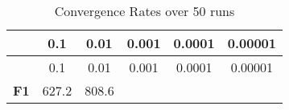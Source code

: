 \documentclass[12pt,a4paper]{article}
\begin{document}
\begin{longtable}[c]{@{}cccccc@{}}
\caption{Convergence Rates over 50 runs}\tabularnewline
\toprule
\begin{minipage}[b]{0.12\columnwidth}\centering\strut
~
\strut\end{minipage} &
\begin{minipage}[b]{0.07\columnwidth}\centering\strut
0.1
\strut\end{minipage} &
\begin{minipage}[b]{0.08\columnwidth}\centering\strut
0.01
\strut\end{minipage} &
\begin{minipage}[b]{0.09\columnwidth}\centering\strut
0.001
\strut\end{minipage} &
\begin{minipage}[b]{0.10\columnwidth}\centering\strut
0.0001
\strut\end{minipage} &
\begin{minipage}[b]{0.10\columnwidth}\centering\strut
0.00001
\strut\end{minipage}\tabularnewline
\midrule
\endfirsthead
\toprule
\begin{minipage}[b]{0.12\columnwidth}\centering\strut
~
\strut\end{minipage} &
\begin{minipage}[b]{0.07\columnwidth}\centering\strut
0.1
\strut\end{minipage} &
\begin{minipage}[b]{0.08\columnwidth}\centering\strut
0.01
\strut\end{minipage} &
\begin{minipage}[b]{0.09\columnwidth}\centering\strut
0.001
\strut\end{minipage} &
\begin{minipage}[b]{0.10\columnwidth}\centering\strut
0.0001
\strut\end{minipage} &
\begin{minipage}[b]{0.10\columnwidth}\centering\strut
0.00001
\strut\end{minipage}\tabularnewline
\midrule
\endhead
\begin{minipage}[t]{0.12\columnwidth}\centering\strut
\textbf{F1}
\strut\end{minipage} &
\begin{minipage}[t]{0.07\columnwidth}\centering\strut
627.2
\strut\end{minipage} &
\begin{minipage}[t]{0.08\columnwidth}\centering\strut
808.6
\strut\end{minipage} &

\end{longtable}
\end{document}
